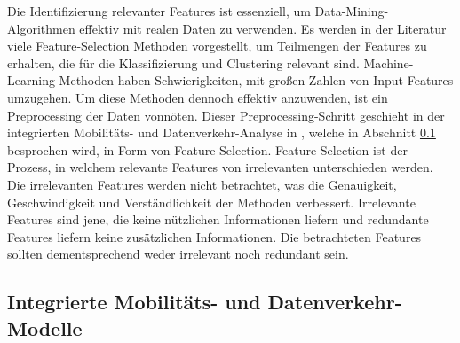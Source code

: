 \documentclass[12pt, a4paper]{article}
\begin{document}
Die Identifizierung relevanter Features ist essenziell, um Data-Mining-Algorithmen effektiv mit realen Daten zu verwenden.
Es werden in der Literatur viele Feature-Selection Methoden vorgestellt, um Teilmengen der Features zu erhalten,
die für die Klassifizierung und Clustering relevant sind.
Machine-Learning-Methoden haben Schwierigkeiten, mit großen Zahlen von Input-Features
umzugehen. Um diese Methoden dennoch effektiv anzuwenden, ist ein Preprocessing der Daten vonnöten. \cite{Kumar2014}
Dieser Preprocessing-Schritt geschieht in der integrierten Mobilitäts- und Datenverkehr-Analyse in \cite{Alipour2018},
welche in Abschnitt \ref{sec:phase3} besprochen wird, in Form von Feature-Selection. Feature-Selection ist der Prozess,
in welchem relevante Features von irrelevanten unterschieden werden. Die irrelevanten Features werden nicht betrachtet, 
was die Genauigkeit, Geschwindigkeit und Verständlichkeit der Methoden verbessert. Irrelevante Features sind jene, 
die keine nützlichen Informationen liefern und redundante Features liefern keine zusätzlichen Informationen. \cite{Kumar2014}
Die betrachteten Features sollten dementsprechend weder irrelevant noch redundant sein.

\subsection{Integrierte Mobilitäts- und Datenverkehr-Modelle}
\label{sec:phase3}
\end{document}
